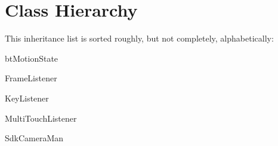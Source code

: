 \section{Class Hierarchy}
This inheritance list is sorted roughly, but not completely, alphabetically\-:\begin{DoxyCompactList}
\item {}
\item {}
\item bt\-Motion\-State\begin{DoxyCompactList}
\item {}
\end{DoxyCompactList}
\item {}
\item {}
\item Frame\-Listener\begin{DoxyCompactList}
\item {}
\begin{DoxyCompactList}
\item {}
\end{DoxyCompactList}
\end{DoxyCompactList}
\item Key\-Listener\begin{DoxyCompactList}
\item {}
\end{DoxyCompactList}
\item Multi\-Touch\-Listener\begin{DoxyCompactList}
\item {}
\end{DoxyCompactList}
\item {}
\item Sdk\-Camera\-Man\begin{DoxyCompactList}
\item {}
\end{DoxyCompactList}

\end{DoxyCompactList}
